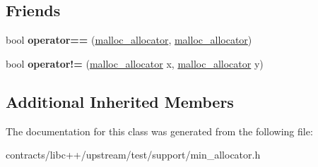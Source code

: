 \subsection*{Friends}
\begin{DoxyCompactItemize}
\item 
\mbox{\label{classmalloc__allocator_a29c7229a9e3dc8594349a786ab269ce3}} 
bool {\bfseries operator==} (\mbox{\hyperlink{classmalloc__allocator}{malloc\+\_\+allocator}}, \mbox{\hyperlink{classmalloc__allocator}{malloc\+\_\+allocator}})
\item 
\mbox{\label{classmalloc__allocator_af06b816e4d1b593f6d293da8e4f7ffa0}} 
bool {\bfseries operator!=} (\mbox{\hyperlink{classmalloc__allocator}{malloc\+\_\+allocator}} x, \mbox{\hyperlink{classmalloc__allocator}{malloc\+\_\+allocator}} y)
\end{DoxyCompactItemize}
\subsection*{Additional Inherited Members}


The documentation for this class was generated from the following file\+:\begin{DoxyCompactItemize}
\item 
contracts/libc++/upstream/test/support/min\+\_\+allocator.\+h\end{DoxyCompactItemize}
